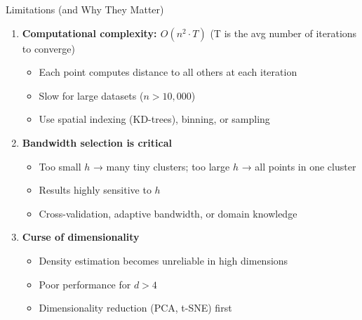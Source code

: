 \begin{frame}{Limitations (and Why They Matter)}
    \begin{enumerate}
        \item \textbf{Computational complexity: $O(n^2 \cdot T)$} (T is the avg number of iterations to converge) 
        \begin{itemize}
            \item[\textcolor{customred}{Why?}] Each point computes distance to all others at each iteration
            \item[\textcolor{customred}{Impact:}] Slow for large datasets ($n > 10{,}000$)
            \item[\textcolor{orange}{Mitigation:}] Use spatial indexing (KD-trees), binning, or sampling
        \end{itemize}

        \vspace{0.3cm}

        \item \textbf{Bandwidth selection is critical}
        \begin{itemize}
            \item[\textcolor{customred}{Why?}] Too small $h$ → many tiny clusters; too large $h$ → all points in one cluster
            \item[\textcolor{customred}{Impact:}] Results highly sensitive to $h$
            \item[\textcolor{orange}{Mitigation:}] Cross-validation, adaptive bandwidth, or domain knowledge
        \end{itemize}

        \vspace{0.3cm}

        \item \textbf{Curse of dimensionality}
        \begin{itemize}
            \item[\textcolor{customred}{Why?}] Density estimation becomes unreliable in high dimensions
            \item[\textcolor{customred}{Impact:}] Poor performance for $d > 4$
            \item[\textcolor{orange}{Mitigation:}] Dimensionality reduction (PCA, t-SNE) first
        \end{itemize}
    \end{enumerate}
\end{frame}


